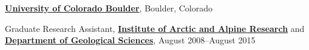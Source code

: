 \documentclass[10pt]{article}
\renewcommand{\section}[1]{\pagebreak[3]%
    \vspace{1.3\baselineskip}%
    \phantomsection\addcontentsline{toc}{section}{#1}%
    \noindent\llap{\large\scshape\smash{\parbox[t]{\marginparwidth}{\hyphenpenalty=10000\raggedright #1}}}%
    \vspace{-\baselineskip}\par}
\begin{document}
\href{http://www.colorado.edu/}{\textbf{University of Colorado Boulder}},
Boulder, Colorado
\begin{outerlist}
\item[] Graduate Research Assistant,
	\href{http://instaar.colorado.edu/}{\textbf{Institute of Arctic and Alpine Research}}
	and \href{http://www.colorado.edu/geolsci/}{\textbf{Department of Geological Sciences}},
	August 2008--August 2015
\end{outerlist}



\end{document}
